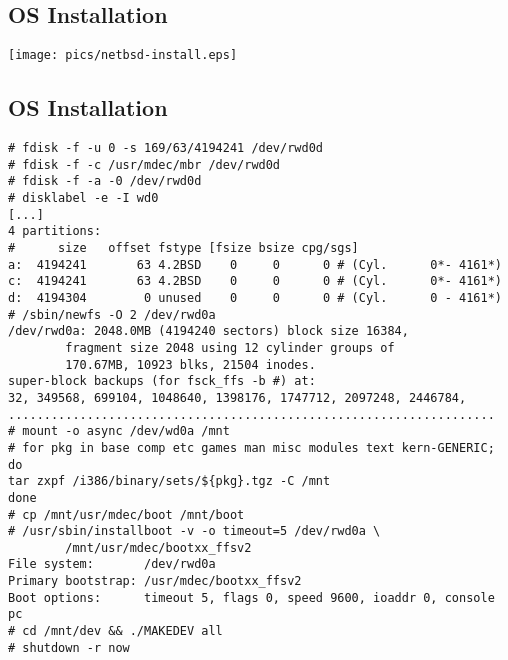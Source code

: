 \documentclass[xga]{xdvislides}
\begin{document}
\subsection{OS Installation}
\begin{center}
	\texttt{[image: pics/netbsd-install.eps]}
\end{center}

\subsection{OS Installation}
\small
\begin{verbatim}
# fdisk -f -u 0 -s 169/63/4194241 /dev/rwd0d
# fdisk -f -c /usr/mdec/mbr /dev/rwd0d
# fdisk -f -a -0 /dev/rwd0d
# disklabel -e -I wd0
[...]
4 partitions:
#      size   offset fstype [fsize bsize cpg/sgs]
a:  4194241       63 4.2BSD    0     0      0 # (Cyl.      0*- 4161*)
c:  4194241       63 4.2BSD    0     0      0 # (Cyl.      0*- 4161*)
d:  4194304        0 unused    0     0      0 # (Cyl.      0 - 4161*)
# /sbin/newfs -O 2 /dev/rwd0a
/dev/rwd0a: 2048.0MB (4194240 sectors) block size 16384,
        fragment size 2048 using 12 cylinder groups of
        170.67MB, 10923 blks, 21504 inodes.
super-block backups (for fsck_ffs -b #) at:
32, 349568, 699104, 1048640, 1398176, 1747712, 2097248, 2446784,
....................................................................
# mount -o async /dev/wd0a /mnt
# for pkg in base comp etc games man misc modules text kern-GENERIC; do
tar zxpf /i386/binary/sets/${pkg}.tgz -C /mnt
done
# cp /mnt/usr/mdec/boot /mnt/boot
# /usr/sbin/installboot -v -o timeout=5 /dev/rwd0a \
        /mnt/usr/mdec/bootxx_ffsv2
File system:       /dev/rwd0a
Primary bootstrap: /usr/mdec/bootxx_ffsv2
Boot options:      timeout 5, flags 0, speed 9600, ioaddr 0, console pc
# cd /mnt/dev && ./MAKEDEV all
# shutdown -r now
\end{verbatim}
\Normalsize
\end{document}
